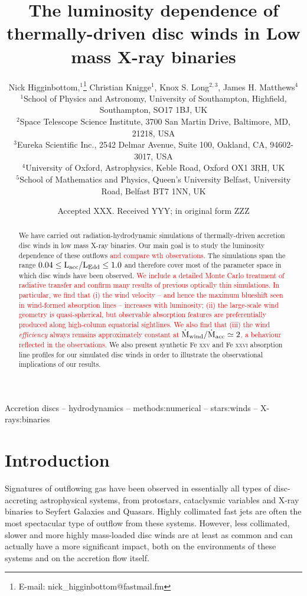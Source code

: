 \documentclass[a4paper,fleqn,usenatbib]{mnras}
\title[The luminosity dependence of disc winds in LMXBs]{The luminosity dependence of thermally-driven disc winds in Low mass X-ray binaries}
\author[N. Higginbottom et. al]
{Nick Higginbottom,$^{1}$\thanks{E-mail: nick\_higginbottom@fastmail.fm}
Christian Knigge$^{1}$, Knox S. Long$^{2,3}$, 
James H. Matthews$^{4}$ \newauthor{and
Edward J. Parkinson$^{1}$.}
\\
$^{1}$School of Physics and Astronomy, University of Southampton, Highfield, Southampton, SO17 1BJ, UK\\
$^{2}$Space Telescope Science Institute, 3700 San Martin Drive, Baltimore, MD, 21218, USA\\
$^{3}$Eureka Scientific Inc., 2542 Delmar Avenue, Suite 100, Oakland, CA, 94602-3017, USA\\
$^{4}$University of Oxford, Astrophysics, Keble Road, Oxford OX1 3RH, UK\\
$^{5}$School of Mathematics and Physics, Queen's University Belfast, University Road, Belfast 
BT7 1NN, UK\\
}
\date{Accepted XXX. Received YYY; in original form ZZZ}
\begin{document}
\label{firstpage}
\pagerange{\pageref{firstpage}--\pageref{lastpage}}
\maketitle

\begin{abstract}

  We have carried out radiation-hydrodynamic simulations of
  thermally-driven accretion disc winds in low mass X-ray binaries. Our main
  goal is to study the luminosity dependence of these outflows \textcolor{red}{
  and compare wth observations}. The 
  simulations span the range 
  $\rm{0.04 \leq L_{acc}/L_{Edd} \leq 1.0}$ and therefore cover most
  of the parameter space in which disc winds have been observed. \textcolor{red}{
  We include a detailed Monte Carlo treatment of radiative transfer and confirm 
  many results of previous optically thin simulations. In particular, we find that 
  (i) the wind velocity -- and hence the maximum blueshift seen
  in wind-formed absorption lines -- increases with luminosity;
  (ii) the large-scale wind geometry is quasi-spherical, but 
  observable absorption features are preferentially produced along
  high-column equatorial sightlines. We
  also find that (iii) the wind {\em
  efficiency} always remains approximately
  constant at $\rm{\dot{M}_{wind}/\dot{M}_{acc} \simeq 2}$, a behaviour
  reflected in the observations.}
  We also present synthetic Fe \textsc{xxv}
  and Fe \textsc{xxvi} absorption line profiles for our simulated disc winds in order
  to illustrate the observational implications of our results.

\end{abstract}

\begin{keywords}
Accretion discs -- hydrodynamics -- methods:numerical -- stars:winds -- X-rays:binaries
\end{keywords}



\section{Introduction}
Signatures of outflowing gas have been observed in essentially all
types of disc-accreting astrophysical systems, from protostars,
cataclysmic variables and X-ray binaries to Seyfert Galaxies and
Quasars. Highly collimated fast jets are often the most spectacular
type of outflow from these systems. However, less collimated, slower
and more highly mass-loaded disc winds are at least as common and can 
actually have a more significant impact, both on the environments of
these systems and on the accretion flow itself. 
 
\end{document}
